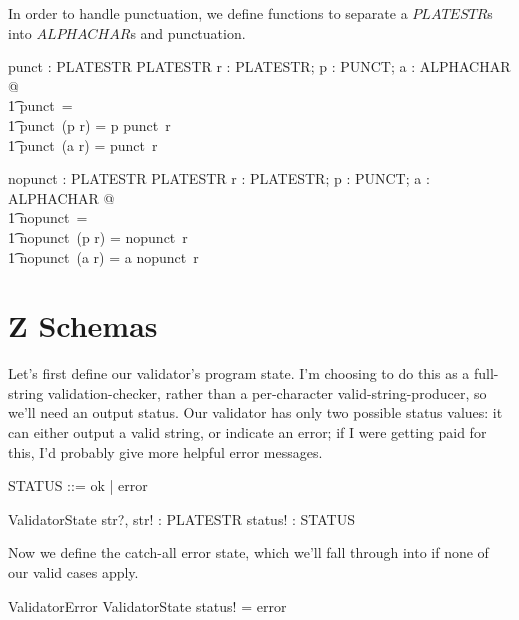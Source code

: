 \documentclass[11pt]{article}
\begin{document}
\begin{spec}
  In order to handle punctuation, we define functions to separate a $PLATESTR$s into $ALPHACHAR$s
  and punctuation.  

  \begin{axdef}
    punct : PLATESTR \fun PLATESTR
    \where
    \forall r : PLATESTR; p : PUNCT; a : ALPHACHAR @ \\
    \t1 punct~\langle \rangle = \langle \rangle \land \\
    \t1 punct~(\langle p \rangle \cat r) = \langle p \rangle \cat punct~r \land \\
    \t1 punct~(\langle a \rangle \cat r) = punct~r
  \end{axdef}

  \begin{axdef}
    nopunct : PLATESTR \fun PLATESTR
    \where
    \forall r : PLATESTR; p : PUNCT; a : ALPHACHAR  @ \\
    \t1 nopunct~\langle \rangle = \langle \rangle \land \\
    \t1 nopunct~(\langle p \rangle \cat r) = nopunct~r \land \\
    \t1 nopunct~(\langle a \rangle \cat r) = \langle a \rangle \cat nopunct~r
  \end{axdef}
  


  \section{Z Schemas}

  Let's first define our validator's program state.  I'm choosing to do this as a full-string
  validation-checker, rather than a per-character valid-string-producer, so we'll need an output
  status.  Our validator has only two possible status values: it can either output a valid string,
  or indicate an error; if I were getting paid for this, I'd probably give more helpful error
  messages.

  \begin{zed}
    STATUS ::= ok | error
  \end{zed}

  \begin{schema}{ValidatorState}
    str?, str! : PLATESTR \also
    status! : STATUS
  \end{schema}

  Now we define the catch-all error state, which we'll fall through into if none of our valid cases
  apply.

  \begin{schema}{ValidatorError}
    ValidatorState
    \where
    status! = error
  \end{schema}


\end{spec}
\end{document}

